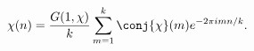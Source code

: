 \[\mathop{\chi\/}\nolimits\!\left(n\right)=\frac{\mathop{G\/}\nolimits\!\left(1,%
\mathop{\chi\/}\nolimits\right)}{k}\sum_{m=1}^{k}\conj{\mathop{\chi\/}%
\nolimits}(m)e^{-2\pi imn/k}.\]
